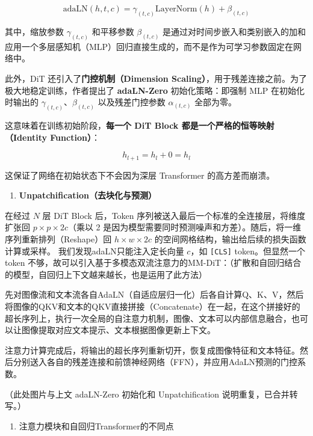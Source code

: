 \[
\mathrm{adaLN}(h,t,c)=\gamma_{(t,c)}\mathrm{LayerNorm}(h)+\beta_{(t,c)}
\]

其中，缩放参数 \(\gamma_{(t,c)}\) 和平移参数 \(\beta_{(t,c)}\) 是通过对时间步嵌入和类别嵌入的加和应用一个多层感知机（MLP）回归直接生成的，而不是作为可学习参数固定在网络中。

此外，DiT 还引入了\textbf{门控机制（Dimension Scaling）}，用于残差连接之前。为了极大地稳定训练，作者提出了 \textbf{adaLN-Zero} 初始化策略：即强制 MLP 在初始化时输出的 \(\gamma_{(t,c)}\)、\(\beta_{(t,c)}\) 以及残差门控参数 \(\alpha_{(t,c)}\) 全部为零。

这意味着在训练初始阶段，\textbf{每一个 DiT Block 都是一个严格的恒等映射（Identity Function）}：

\[
h_{l+1}=h_l+0=h_l
\]

这保证了网络在初始状态下不会因为深层 Transformer 的高方差而崩溃。

\begin{enumerate}
\def\labelenumi{\arabic{enumi}.}
\setcounter{enumi}{2}
\tightlist
\item
  \textbf{Unpatchification（去块化与预测）}
\end{enumerate}

在经过 \(N\) 层 DiT Block 后，Token 序列被送入最后一个标准的全连接层，将维度扩张回 \(p\times p\times 2c\)（乘以 2 是因为模型需要同时预测噪声和方差）。随后，将一维序列重新排列（Reshape）回 \(h\times w\times 2c\) 的空间网格结构，输出给后续的损失函数计算或采样。
我们发现adaLN只能注入定长向量 \(c\)，如 \texttt{{[}CLS{]}} token。但显然一个 token 不够，故可以引入基于多模态双流注意力的MM-DiT：（扩散和自回归结合的模型，自回归上下文越来越长，也是运用了此方法）

先对图像流和文本流各自AdaLN（自适应层归一化）后各自计算Q、K、V，然后将图像的QKV和文本的QKV直接拼接（Concatenate）在一起，在这个拼接好的超长序列上，执行一次全局的自注意力机制，图像、文本可以内部信息融合，也可以让图像提取对应文本提示、文本根据图像更新上下文。

注意力计算完成后，将输出的超长序列重新切开，恢复成图像特征和文本特征。然后分别送入各自的残差连接和前馈神经网络（FFN），并应用AdaLN预测的门控系数。

（此处图片与上文 adaLN-Zero 初始化和 Unpatchification 说明重复，已合并转写。）

\begin{enumerate}
\def\labelenumi{\arabic{enumi}.}
\setcounter{enumi}{3}
\tightlist
\item
  注意力模块和自回归Transformer的不同点
\end{enumerate}

